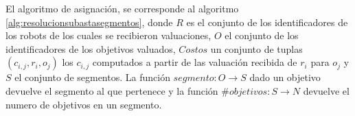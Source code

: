 El algoritmo de asignación, se corresponde al algoritmo
\ref{alg:resolucionsubastasegmentos}, donde $R$ es el conjunto de los
identificadores de los robots de los cuales se recibieron valuaciones, $O$ el
conjunto de los identificadores de los objetivos valuados, $Costos$ un conjunto
de tuplas $(c_{i,j},r_i,o_j)$ los $c_{i,j}$ computados a partir de las
valuación recibida de $r_i$ para $o_j$ y $S$ el conjunto de
segmentos. La función $segmento : O \rightarrow S$ dado un objetivo devuelve el
segmento al que pertenece y la función $\#objetivos : S \rightarrow N$ devuelve
el numero de objetivos en un segmento.

\vspace{1cm}
  
